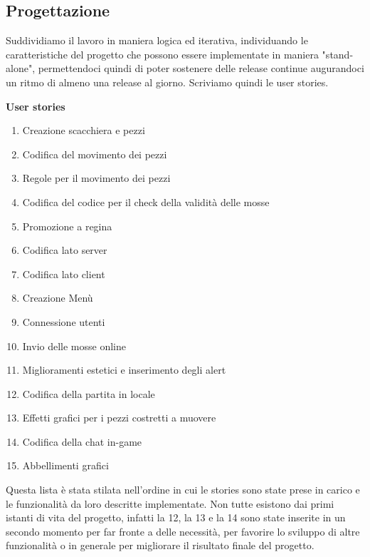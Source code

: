 \documentclass[12pt]{article}
\begin{document}
\subsection{Progettazione}
Suddividiamo il lavoro in maniera logica ed iterativa, individuando le caratteristiche del progetto che possono essere implementate in maniera "stand-alone", permettendoci quindi di poter sostenere delle release continue augurandoci un ritmo di almeno una release al giorno. Scriviamo quindi le user stories.
\newline

\textbf{\Large User stories}
\begin{enumerate}
\item Creazione scacchiera e pezzi
\item Codifica del movimento dei pezzi
\item Regole per il movimento dei pezzi
\item Codifica del codice per il check della validità delle mosse
\item Promozione a regina
\item Codifica lato server
\item Codifica lato client
\item Creazione Menù
\item Connessione utenti
\item Invio delle mosse online
\item Miglioramenti estetici e inserimento degli alert
\item Codifica della partita in locale
\item Effetti grafici per i pezzi costretti a muovere
\item Codifica della chat in-game
\item Abbellimenti grafici
\end{enumerate}

Questa lista è stata stilata nell'ordine in cui le stories sono state prese in carico e le funzionalità da loro descritte implementate. Non tutte esistono dai primi istanti di vita del progetto, infatti la 12, la 13 e la 14 sono state inserite in un secondo momento per far fronte a delle necessità, per favorire  lo sviluppo di altre funzionalità o in generale per migliorare il risultato finale del progetto.
\end{document}
